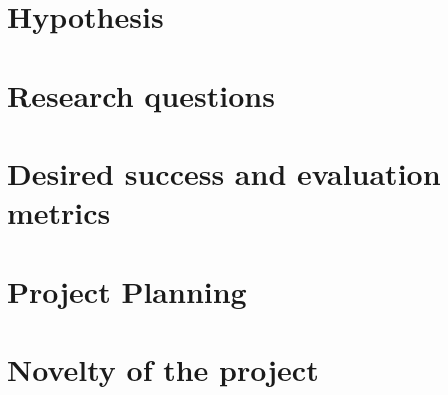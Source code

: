 

\section{Hypothesis}
\label{sec:hypothesis}


\section{Research questions}
\label{sec:research_questions}


\section{Desired success and evaluation metrics}
\label{sec:metrics}


\section{Project Planning}
\label{sec:project_planning}


\section{Novelty of the project}
\label{sec:novelty}


